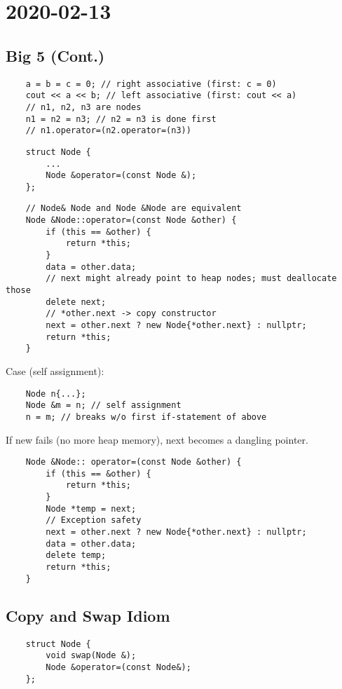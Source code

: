 \section{2020-02-13}
\subsection{Big 5 (Cont.)}
\begin{lstlisting}
    a = b = c = 0; // right associative (first: c = 0)
    cout << a << b; // left associative (first: cout << a)
    // n1, n2, n3 are nodes
    n1 = n2 = n3; // n2 = n3 is done first
    // n1.operator=(n2.operator=(n3))
\end{lstlisting}

\begin{lstlisting}
    struct Node {
        ...
        Node &operator=(const Node &);
    };
\end{lstlisting}

\begin{lstlisting}
    // Node& Node and Node &Node are equivalent
    Node &Node::operator=(const Node &other) {
        if (this == &other) {
            return *this;
        }
        data = other.data;
        // next might already point to heap nodes; must deallocate those
        delete next;
        // *other.next -> copy constructor
        next = other.next ? new Node{*other.next} : nullptr;
        return *this;
    }
\end{lstlisting}
Case (self assignment):
\begin{lstlisting}
    Node n{...};
    Node &m = n; // self assignment
    n = m; // breaks w/o first if-statement of above
\end{lstlisting}
If new fails (no more heap memory), next becomes a dangling pointer.

\begin{lstlisting}
    Node &Node:: operator=(const Node &other) {
        if (this == &other) {
            return *this;
        }
        Node *temp = next;
        // Exception safety
        next = other.next ? new Node{*other.next} : nullptr;
        data = other.data;
        delete temp;
        return *this;
    }
\end{lstlisting}

\subsection{Copy and Swap Idiom}
\begin{lstlisting}
    struct Node {
        void swap(Node &);
        Node &operator=(const Node&);
    };
\end{lstlisting}

